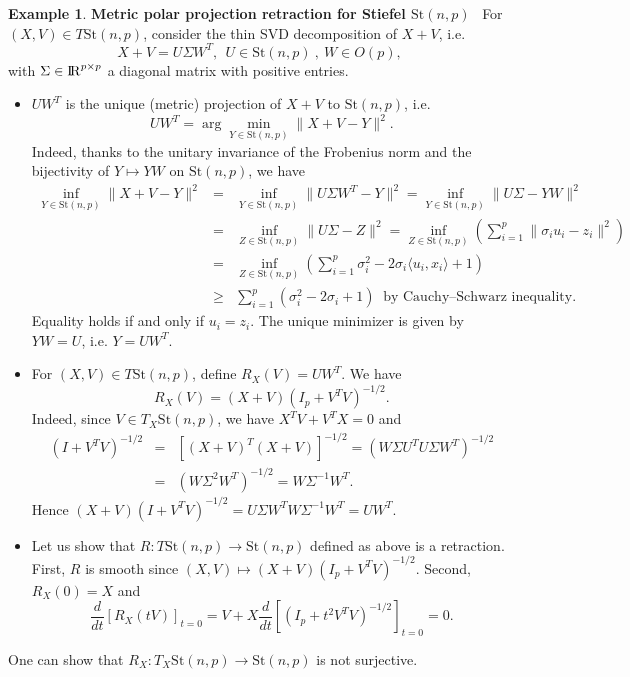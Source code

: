 \documentclass[10pt,a4paper]{book}
\theoremstyle{definition}
\newtheorem{exm}{Example}[section]
\theoremstyle{plain}
\theoremstyle{remark}
\def\R{{\rm I\kern-0.16em R}}
\begin{document}
\begin{exm} \textbf{Metric polar projection retraction for Stiefel $\text{St}(n,p)$}~
For $(X,V)\in T\text{St}(n,p)$, consider the thin SVD decomposition of $X+V$, i.e.
$$X+V= U\Sigma W^{T},~~U\in \text{St}(n,p)~,~W\in O(p),$$
with $\Sigma\in \R^{p\times p}$ a diagonal matrix with positive entries.
\begin{itemize}
\item $UW^{T}$ is the unique (metric) projection of $X+V$ to $\text{St}(n,p)$, i.e. 
$$UW^{T}=\arg\min_{Y\in \text{St}(n,p)}\|X+V-Y\|^2.$$
Indeed, thanks to the unitary invariance of the Frobenius norm and the bijectivity of $Y\mapsto YW$ on $\text{St}(n,p)$, we have
\begin{eqnarray*}
\inf_{Y\in \text{St}(n,p)}\|X+V-Y\|^2&=&\inf_{Y \in \text{St}(n,p)}\|U\Sigma W^{T}-Y\|^2=\inf_{Y\in \text{St}(n,p)}\|U\Sigma-YW\|^2\\
&=&\inf_{Z\in \text{St}(n,p)}\|U\Sigma-Z\|^2=\inf_{Z\in \text{St}(n,p)}\left( \sum_{i=1}^{p}\|\sigma_iu_i-z_i\|^2\right)\\
&=&\inf_{Z\in \text{St}(n,p)}\left(\sum_{i=1}^{p}\sigma_i^2-2\sigma_i\langle u_i,x_i\rangle +1\right)\\
&\ge& \sum_{i=1}^{p}(\sigma_i^2-2\sigma_i+1)~\text{~by Cauchy--Schwarz inequality}.
\end{eqnarray*}
Equality holds if and only if $u_i=z_i$. The unique minimizer is given by $YW=U$, i.e. $Y=UW^{T}$. 
\item For $(X,V) \in T\text{St}(n,p)$, define $R_X(V)=UW^{T}$. We have
$$R_X(V)=(X+V)(I_p+V^TV)^{-1/2}.$$ Indeed, since $V\in T_X\text{St}(n,p)$, we have $X^{T}V+V^{T}X=0$ and
\begin{eqnarray*}
(I+V^TV)^{-1/2}&=&\left[ (X+V)^{T}(X+V)\right]^{-1/2}=(W\Sigma U^TU\Sigma W^T)^{-1/2}\\
&=&(W\Sigma^2W^{T})^{-1/2}=W\Sigma^{-1}W^{T}.
\end{eqnarray*}
Hence $(X+V)(I+V^{T}V)^{-1/2}=U\Sigma W^{T} W\Sigma^{-1}W^{T}=UW^{T}$.
\item Let us show that $R:T\text{St}(n,p)\to \text{St}(n,p)$ defined as above is a retraction. 
First, $R$ is smooth since $(X,V)\mapsto (X+V)(I_p+V^TV)^{-1/2}$. Second, $R_X(0)=X$ and 
$$\frac{d}{dt}[R_X(tV)]_{t=0}=V+X\frac{d}{dt}[(I_p+t^2V^TV)^{-1/2}]_{t=0}=0.$$
\end{itemize}
One can show that $R_X:T_X\text{St}(n,p)\to \text{St}(n,p)$ is not surjective.
\end{exm}
\end{document}
